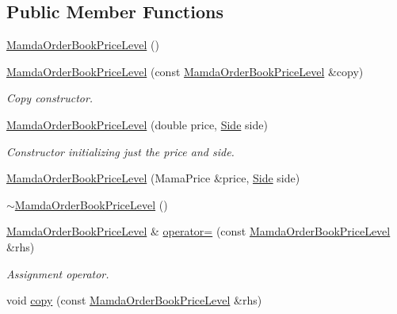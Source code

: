\subsection*{Public Member Functions}
\begin{CompactItemize}
\item 
\hyperlink{classWombat_1_1MamdaOrderBookPriceLevel_f2a76dd1f145318e9bbbd0878dda16dd}{Mamda\-Order\-Book\-Price\-Level} ()
\item 
\hyperlink{classWombat_1_1MamdaOrderBookPriceLevel_fead97f8761ee45baa73f930bb4e8b28}{Mamda\-Order\-Book\-Price\-Level} (const \hyperlink{classWombat_1_1MamdaOrderBookPriceLevel}{Mamda\-Order\-Book\-Price\-Level} \&copy)
\begin{CompactList}\small\item\em Copy constructor. \item\end{CompactList}\item 
\hyperlink{classWombat_1_1MamdaOrderBookPriceLevel_b17b4def9722974d649c188305715970}{Mamda\-Order\-Book\-Price\-Level} (double price, \hyperlink{classWombat_1_1MamdaOrderBookPriceLevel_384c34b0a74d874b8969dee9b0d3718d}{Side} side)
\begin{CompactList}\small\item\em Constructor initializing just the price and side. \item\end{CompactList}\item 
\hyperlink{classWombat_1_1MamdaOrderBookPriceLevel_e0cf6f3c3083f53f92171bee7b9ce134}{Mamda\-Order\-Book\-Price\-Level} (Mama\-Price \&price, \hyperlink{classWombat_1_1MamdaOrderBookPriceLevel_384c34b0a74d874b8969dee9b0d3718d}{Side} side)
\item 
\hyperlink{classWombat_1_1MamdaOrderBookPriceLevel_b2ff6deeca05206499b70c532b2e2193}{$\sim$Mamda\-Order\-Book\-Price\-Level} ()
\item 
\hyperlink{classWombat_1_1MamdaOrderBookPriceLevel}{Mamda\-Order\-Book\-Price\-Level} \& \hyperlink{classWombat_1_1MamdaOrderBookPriceLevel_66dce36048fc4ad101fdc8fa06875bb1}{operator=} (const \hyperlink{classWombat_1_1MamdaOrderBookPriceLevel}{Mamda\-Order\-Book\-Price\-Level} \&rhs)
\begin{CompactList}\small\item\em Assignment operator. \item\end{CompactList}\item 
void \hyperlink{classWombat_1_1MamdaOrderBookPriceLevel_ec111c85e21764c14ff1b66adb994563}{copy} (const \hyperlink{classWombat_1_1MamdaOrderBookPriceLevel}{Mamda\-Order\-Book\-Price\-Level} \&rhs)

\end{CompactItemize}
